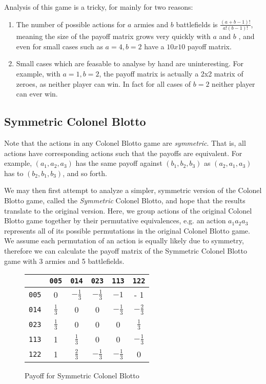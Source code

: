 \documentclass [11pt]{article}
\begin{document}
Analysis of this game is a tricky, for mainly for two reasons:

\begin{enumerate}
  \item The number of possible actions for $a$ armies and $b$ battlefields is $\frac{(a + b - 1)!}{a! (b -1)!}$, meaning the size of the payoff matrix grows very quickly with $a$ and $b$ , and even for small cases such as $a=4, b=2$  have a $10x10$ payoff matrix.
  \item Small cases which are feasable to analyse by hand are uninteresting. For example, with $a = 1, b = 2$, the payoff matrix is actually a 2x2 matrix of zeroes, as neither player can win. In fact for all cases of $b=2$ neither player can ever win.
\end{enumerate}

\subsection{Symmetric Colonel Blotto} \label{sym-blotto}

Note that the actions in any Colonel Blotto game are \textit{symmetric}. That is, all actions have corresponding actions such that the payoffs are equivalent. For example, $(a_1, a_2, a_3)$ has the same payoff against $(b_1, b_2, b_3)$ as $(a_2, a_1, a_3)$ has to $(b_2, b_1, b_3)$, and so forth.

We may then first attempt to analyze a simpler, symmetric version of the Colonel Blotto game, called the \textit{Symmetric} Colonel Blotto, and hope that the results translate to the original version. Here, we group actions of the original Colonel Blotto game together by their permutative equivalences, e.g. an action $a_1 a_2 a_3 $ represents all of its possible permutations in the original Colonel Blotto game. We assume each permutation of an action is equally likely due to symmetry, therefore we can calculate the payoff matrix of the Symmetric Colonel Blotto game with 3 armies and 5 battlefields.

\begin{figure}[H]
  \renewcommand{\arraystretch}{1.75}
  \centering
  \begin{tabular}{|c|c|c|c|c|c|}
  \hline
  & \texttt{005} & \texttt{014} & \texttt{023} & \texttt{113} & \texttt{122} \\[2ex]
  \hline
    \texttt{005} & 0 & $- \frac{1}{3}$ & $- \frac{1}{3}$ & $-1$ & - 1 \\
    \hline
    \texttt{014} & $\frac{1}{3}$ & 0 & 0 & $-\frac{1}{3}$ & $- \frac{2}{3}$ \\
    \hline
    \texttt{023} & $\frac{1}{3}$ & 0 & 0 & 0 & $ \frac{1}{3}$ \\
    \hline
    \texttt{113} & 1 & $\frac{1}{3}$ & 0 & 0 & $ -\frac{1}{3}$ \\
    \hline
    \texttt{122} & 1 & $\frac{2}{3}$ & $-\frac{1}{3}$ & $-\frac{1}{3}$ & 0 \\
    \hline
  \end{tabular}
  \caption{Payoff for Symmetric Colonel Blotto}%
  \label{sym-blotto-full}
\end{figure}
\end{document}
